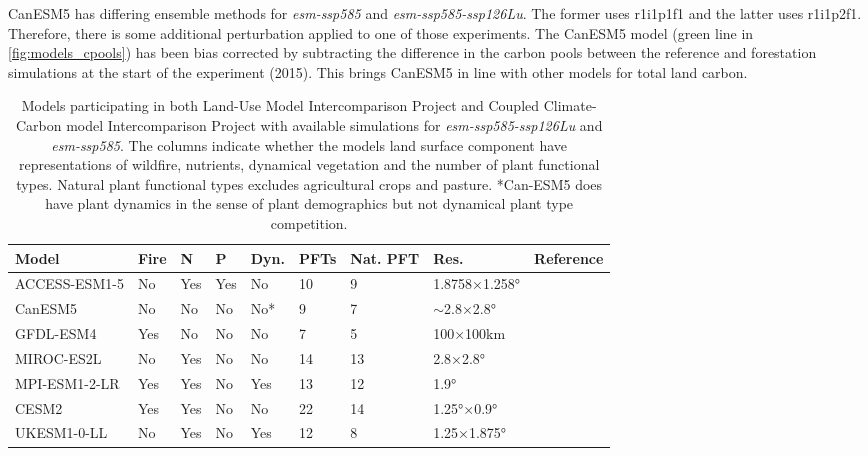 \documentclass[]{article}
\begin{document}
CanESM5 has differing ensemble methods for \textit{esm-ssp585} and \textit{esm-ssp585-ssp126Lu}.
The former uses r1i1p1f1 and the latter uses r1i1p2f1.
Therefore, there is some additional perturbation applied to one of those experiments.
The CanESM5 model (green line in \ref{fig:models_cpools}) has been bias corrected by subtracting the difference in the carbon pools between the reference and forestation simulations at the start of the experiment (2015).
This brings CanESM5 in line with other models for total land carbon.

\begin{table}[H]
    \centering
    \begin{tabular}{lllllllll}
        \hline
Model         & Fire & N   & P   & Dyn.  & PFTs     & Nat. PFT & Res.           & Reference                           \\ \hline
ACCESS-ESM1-5 & No   & Yes & Yes & No    & 10       & 9       & 1.8758×1.258°   & \cite{ziehn_australian_2020}   \\
CanESM5       & No   & No  & No  & No*   & 9        & 7       & $\sim$2.8×2.8°  & \cite{swart_canadian_2019}     \\
GFDL-ESM4     & Yes  & No  & No  & No    & 7        & 5       & 100×100km       & \cite{dunne_gfdl_2020}         \\
MIROC-ES2L    & No   & Yes & No  & No    & 14       & 13      & 2.8×2.8°        & \cite{hajima_development_2020} \\
MPI-ESM1-2-LR & Yes  & Yes & No  & Yes   & 13       & 12      & 1.9°            & \cite{giorgetta_climate_2013}  \\
CESM2         & Yes  & Yes & No  & No    & 22       & 14      & 1.25°×0.9°      & \cite{danabasoglu_community_2020} \\
UKESM1-0-LL   & No   & Yes & No  & Yes   & 12       & 8       & 1.25×1.875°     & \cite{sellar_ukesm1_2019}      \\ \hline
    \end{tabular}
    \caption{Models participating in both Land-Use Model Intercomparison Project and Coupled Climate-Carbon model Intercomparison Project with available simulations for \textit{esm-ssp585-ssp126Lu} and \textit{esm-ssp585}. The columns indicate whether the models land surface component have representations of wildfire, nutrients, dynamical vegetation and the number of plant functional types. Natural plant functional types excludes agricultural crops and pasture. *Can-ESM5 does have plant dynamics in the sense of plant demographics but not dynamical plant type competition.}
    \label{tab:models}
\end{table}
\end{document}
